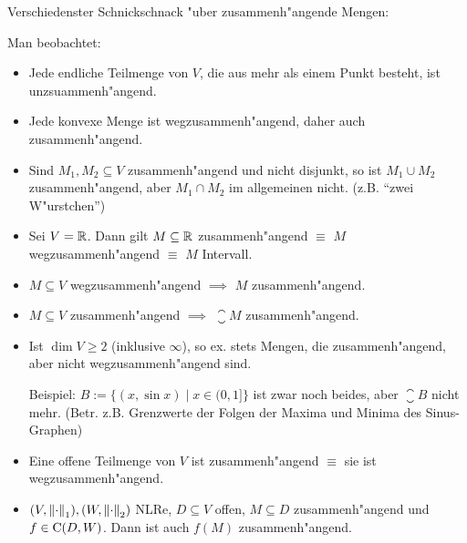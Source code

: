 \remark Verschiedenster Schnickschnack "uber zusammenh"angende Mengen:{
  Man beobachtet:
  \begin{itemize}
    \item Jede endliche Teilmenge von $V$, die aus mehr als einem 
      Punkt besteht, ist unzsuammenh"angend.
    \item Jede konvexe Menge ist wegzusammenh"angend, daher auch 
      zusammenh"angend.
    \item Sind $M_1,M_2\subseteq V$ zusammenh"angend und nicht disjunkt,
      so ist $M_1\cup M_2$ zusammenh"angend, aber $M_1\cap M_2$ im 
      allgemeinen nicht. (z.B. ``zwei W"urstchen'')
    \item Sei $V=\mathbb R$. Dann gilt $M\subseteq\mathbb R$ zusammenh"angend
      $\equiv$ $M$ wegzusammenh"angend $\equiv$ $M$ Intervall.
    \item $M\subseteq V$ wegzusammenh"angend $\implies$ $M$
      zusammenh"angend.
    \item $M\subseteq V$ zusammenh"angend $\implies$ $\closure M$ 
      zusammenh"angend.
    \item Ist $\dim V\geq 2$ (inklusive $\infty$), so ex. stets Mengen,
      die zusammenh"angend, aber nicht wegzusammenh"angend sind.
      
      Beispiel: $B:=\{(x,\sin x)\mid x\in (0,1]\}$ ist zwar noch
      beides, aber $\closure B$ nicht mehr. (Betr. z.B. Grenzwerte
      der Folgen der Maxima und Minima des Sinus-Graphen)
    \item Eine offene Teilmenge von $V$ ist zusammenh"angend $\equiv$
      sie ist wegzusammenh"angend.
    \item $(V,{\left\| \cdot\right\|}_1),(W,{\left\| \cdot\right\|}_2)$ NLRe, $D\subseteq V$ offen, 
      $M\subseteq D$ zusammenh"angend und $f\in{\rm C}(D,W)$. Dann
      ist auch $f(M)$ zusammenh"angend.
    \end{itemize}
  }
